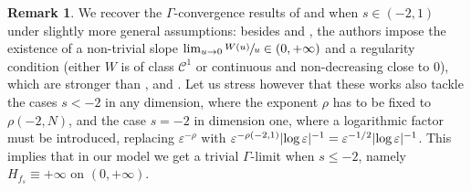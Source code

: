 \documentclass[JEP,XML,SOM,Unicode,published]{cedram}
\theoremstyle{plain}
\theoremstyle{definition}
\newtheorem{remark}[theorem]{Remark}
\newcommand{\Cspace}{\mathscr{C}}
\newcommand{\eps}{\varepsilon}
\DeclarePairedDelimiter{\abs}{\lvert}{\rvert}
\begin{document}
\begin{remark}
We recover the $\Gamma$-convergence results of \cite{bouchitteTransitionsPhasesAvec1996} and \cite{dubsProblemesPerturbationsSingulieres1998} when $s \in (-2,1)$ under slightly more general assumptions: besides  and , the authors impose the existence of a non-trivial slope $\lim_{u\to 0} \sfrac{W(u)}u \in (0,+\infty)$ and a regularity condition (either $W$ is of class $\Cspace^1$ or continuous and non-decreasing close to $0$), which are stronger than ,  and . Let us stress however that these works also tackle the cases $s < -2$ in any dimension, where the exponent $\rho$ has to be fixed to $\rho(-2,N)$, and the case $s=-2$ in dimension one, where a logarithmic factor must be introduced, replacing $\eps^{-\rho}$ with $\eps^{-\rho(-2,1)} \abs{\log\eps}^{-1} = \eps^{-1/2} \abs{\log \eps}^{-1}$. This implies that in our model we get a trivial $\Gamma$-limit when $s \leq -2$, namely $H_{f_s} \equiv +\infty$ on $(0,+\infty)$.
\end{remark}

\backmatter


\end{document}
